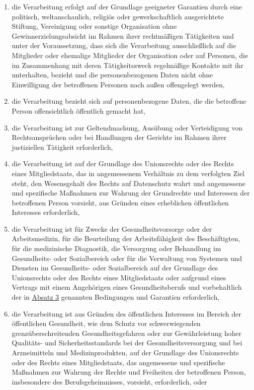 \begin{enumerate}
\begin{enumerate}
    \item die Verarbeitung erfolgt auf der Grundlage geeigneter Garantien durch eine politisch, weltanschaulich,
     religiös oder gewerkschaftlich ausgerichtete Stiftung, Vereinigung oder sonstige Organisation ohne
     Gewinnerzielungsabsicht im Rahmen ihrer rechtmäßigen Tätigkeiten und unter der Voraussetzung, dass sich die
     Verarbeitung ausschließlich auf die Mitglieder oder ehemalige Mitglieder der Organisation oder auf Personen, die
     im Zusammenhang mit deren Tätigkeitszweck regelmäßige Kontakte mit ihr unterhalten, bezieht und die
     personenbezogenen Daten nicht ohne Einwilligung der betroffenen Personen nach außen offengelegt werden,
    \label{itm:09-2d}

    \item die Verarbeitung bezieht sich auf personenbezogene Daten, die die betroffene Person offensichtlich öffentlich
     gemacht hat,
    \label{itm:09-2e}

    \item die Verarbeitung ist zur Geltendmachung, Ausübung oder Verteidigung von Rechtsansprüchen oder bei Handlungen
     der Gerichte im Rahmen ihrer justiziellen Tätigkeit erforderlich,
    \label{itm:09-2f}

    \item die Verarbeitung ist auf der Grundlage des Unionsrechts oder des Rechts eines Mitgliedstaats, das in
     angemessenem Verhältnis zu dem verfolgten Ziel steht, den Wesensgehalt des Rechts auf Datenschutz wahrt und
     angemessene und spezifische Maßnahmen zur Wahrung der Grundrechte und Interessen der betroffenen Person vorsieht,
     aus Gründen eines erheblichen öffentlichen Interesses erforderlich,
    \label{itm:09-2g}

    \item die Verarbeitung ist für Zwecke der Gesundheitsvorsorge oder der Arbeitsmedizin, für die Beurteilung der
     Arbeitsfähigkeit des Beschäftigten, für die medizinische Diagnostik, die Versorgung oder Behandlung im
     Gesundheits- oder Sozialbereich oder für die Verwaltung von Systemen und Diensten im Gesundheits- oder
     Sozialbereich auf der Grundlage des Unionsrechts oder des Rechts eines Mitgliedstaats oder aufgrund eines Vertrags
     mit einem Angehörigen eines Gesundheitsberufs und vorbehaltlich der in \hyperref[itm:09-3]{Absatz 3} genannten
     Bedingungen und Garantien erforderlich,
    \label{itm:09-2h}

    \item die Verarbeitung ist aus Gründen des öffentlichen Interesses im Bereich der öffentlichen Gesundheit, wie dem
     Schutz vor schwerwiegenden grenzüberschreitenden Gesundheitsgefahren oder zur Gewährleistung hoher Qualitäts- und
     Sicherheitsstandards bei der Gesundheitsversorgung und bei Arzneimitteln und Medizinprodukten, auf der Grundlage
     des Unionsrechts oder des Rechts eines Mitgliedstaats, das angemessene und spezifische Maßnahmen zur Wahrung der
     Rechte und Freiheiten der betroffenen Person, insbesondere des Berufsgeheimnisses, vorsieht, erforderlich, oder
    \label{itm:09-2i}


\end{enumerate}
\end{enumerate}
